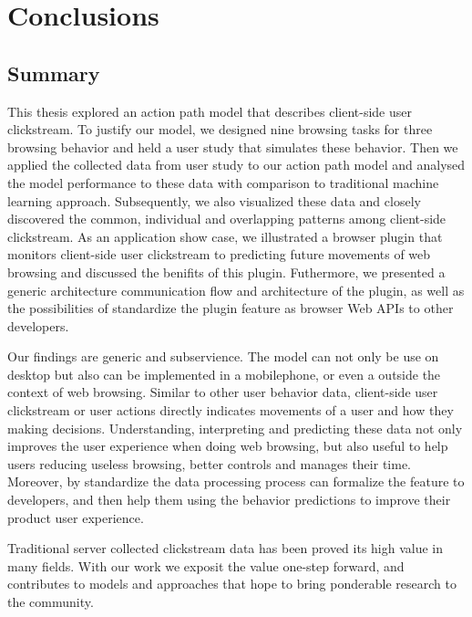 \section{Conclusions}
\label{ch:final}

\subsection{Summary}


This thesis explored an action path model that describes client-side user clickstream.
To justify our model, we designed nine browsing tasks for three browsing behavior and 
held a user study that simulates these behavior. 
Then we applied the collected data from user study to our action path model and
analysed the model performance to these data with comparison to traditional machine 
learning approach.
Subsequently, we also visualized these data and closely discovered the common, 
individual and overlapping patterns among client-side clickstream.
As an application show case, we illustrated a browser plugin that monitors client-side 
user clickstream to predicting future movements of web browsing and discussed the benifits of this plugin.
Futhermore, we presented a generic architecture communication flow and architecture of the plugin, as well as the possibilities of standardize the plugin feature as browser Web APIs to other developers.



Our findings are generic and subservience. The model can not only be use on desktop but
also can be implemented in a mobilephone, or even a outside the context of web browsing. 
Similar to other user behavior data, client-side user clickstream or user actions 
directly indicates movements of a user and how they making decisions. Understanding, 
interpreting and predicting these data not only improves the user experience when doing
web browsing, but also useful to help users reducing useless browsing, better controls 
and manages their time. Moreover, by standardize the data processing process can formalize
the feature to developers, and then help them using the behavior predictions to
improve their product user experience.

Traditional server collected clickstream data has been proved its high value in many fields. With our work we exposit the value one-step forward, and contributes to models and approaches that hope to bring ponderable research to the community.


\cleardoublepage